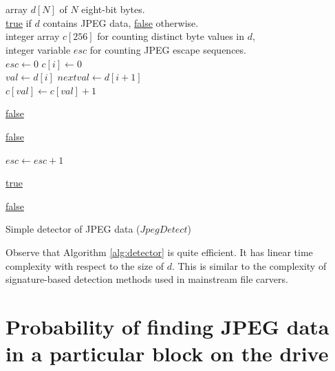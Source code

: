 \documentclass[final,5p,times,twocolumn,authoryear]{elsarticle}
\begin{document}
\begin{algorithm}[ht]
\begin{algorithmic}
    \\
    \INPUT 
    \\ {array $d[N]$ of $N$ eight-bit bytes.}
    \RETURNS 
    \\ {\underline{true} if $d$ contains JPEG data, \underline{false} otherwise.}
    \VARIABLES 
    \\ {integer array $c[256]$ for counting distinct byte values in $d$, \\ integer variable $esc$ for counting JPEG escape sequences.}
    \\
    \State $esc \gets 0$
       \State $c[i] \gets 0$
    \EndFor
    \\
     
       \State $val \gets d[i]$
       \State $nextval \gets d[i+1]$
       \\
       \State $c[val] \gets c[val]+1$ 
       \\

          \Return \underline{false} 
       \EndIf
       \\

          \Return \underline{false} 
       \EndIf
       \\

          \State $esc \gets esc+1$ 
       \EndIf       
    \EndFor 
    \\
    
		\Return \underline{true} 
    \Else
    
        \Return \underline{false}
    \EndIf       
    
\end{algorithmic}
\caption{Simple detector of JPEG data ($JpegDetect$)}
\label{alg:detector}
\end{algorithm}

Observe that Algorithm \ref{alg:detector} is quite efficient. It has linear time complexity with respect to the size of $d$. This is similar to the complexity of signature-based detection methods used in mainstream file carvers.  

\section{Probability of finding JPEG data in a particular block on the drive}
\label{sec:probability}
\end{document}
